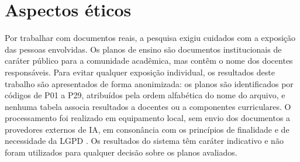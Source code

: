 \section{Aspectos éticos}

Por trabalhar com documentos reais, a pesquisa exigiu cuidados com a exposição das pessoas envolvidas. Os planos de ensino são documentos institucionais de caráter público para a comunidade acadêmica, mas contêm o nome dos docentes responsáveis. Para evitar qualquer exposição individual, os resultados deste trabalho são apresentados de forma anonimizada: os planos são identificados por códigos de P01 a P29, atribuídos pela ordem alfabética do nome do arquivo, e nenhuma tabela associa resultados a docentes ou a componentes curriculares. O processamento foi realizado em equipamento local, sem envio dos documentos a provedores externos de IA, em consonância com os princípios de finalidade e de necessidade da LGPD \cite{Brasil2018}. Os resultados do sistema têm caráter indicativo e não foram utilizados para qualquer decisão sobre os planos avaliados.
